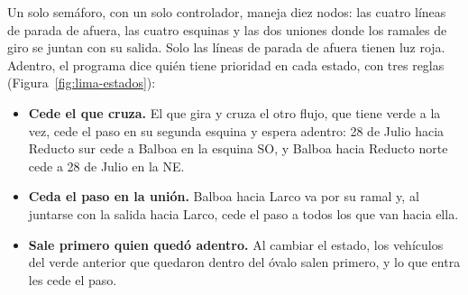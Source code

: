 Un solo semáforo, con un solo controlador, maneja diez nodos: las cuatro
líneas de parada de afuera, las cuatro esquinas y las dos uniones donde
los ramales de giro se juntan con su salida. Solo las líneas de parada
de afuera tienen luz roja. Adentro, el programa dice quién tiene
prioridad en cada estado, con tres reglas
(Figura~\ref{fig:lima-estados}):
\begin{itemize}
  \item \textbf{Cede el que cruza.} El que gira y cruza el otro flujo,
    que tiene verde a la vez, cede el paso en su segunda esquina y espera
    adentro: 28 de Julio hacia Reducto sur cede a Balboa en la esquina
    SO, y Balboa hacia Reducto norte cede a 28 de Julio en la NE.
  \item \textbf{Ceda el paso en la unión.} Balboa hacia Larco va por su
    ramal y, al juntarse con la salida hacia Larco, cede el paso a todos
    los que van hacia ella.
  \item \textbf{Sale primero quien quedó adentro.} Al cambiar el estado,
    los vehículos del verde anterior que quedaron dentro del óvalo salen
    primero, y lo que entra les cede el paso.
\end{itemize}

